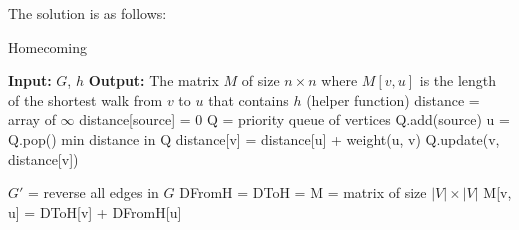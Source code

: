 \documentclass[10pt]{article}
\begin{document}
\begin{solution}
    The solution is as follows:
    \begin{algorithm}
        \caption{Homecoming} 
        \begin{algorithmic}[1]
        \Statex \textbf{Input:} $G$, $h$
        \Statex \textbf{Output:} The matrix $M$ of size $n \times n$ where $M[v, u]$ is the length of the shortest walk from $v$ to $u$ that contains $h$
        \Statex 
         (helper function)
            \State distance = array of $\infty$ 
            \State distance[source] = 0
            \State Q = priority queue of vertices
            \State Q.add(source)
                \State u = Q.pop() min distance in Q
                        \State distance[v] = distance[u] + weight(u, v)
                        \State Q.update(v, distance[v])
                    \EndIf
                \EndFor
            \EndWhile

        \EndFunction
        \Statex
            \State $G'$ = reverse all edges in $G$
            \State DFromH = 
            \State DToH = 
            \State M = matrix of size $|V| \times |V|$
                    \State M[v, u] = DToH[v] + DFromH[u]
                \EndFor
            \EndFor


\end{algorithmic}
\end{algorithm}
\end{solution}
\end{document}
